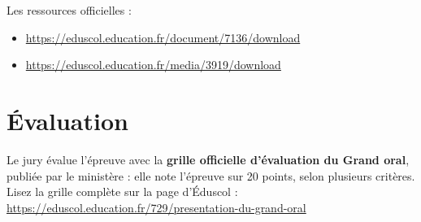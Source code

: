 Les ressources officielles :
\begin{itemize}
    \item \url{https://eduscol.education.fr/document/7136/download}
    \item \url{https://eduscol.education.fr/media/3919/download}
\end{itemize}

\section{Évaluation}
Le jury évalue l'épreuve avec la \textbf{grille officielle d'évaluation du Grand oral}, publiée par le ministère : elle note l'épreuve sur 20 points, selon plusieurs critères. Lisez la grille complète sur la page d'Éduscol :\\
\url{https://eduscol.education.fr/729/presentation-du-grand-oral}
\newpage





